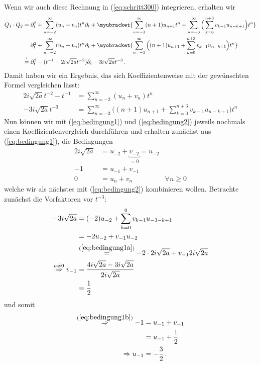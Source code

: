 Wenn wir auch diese Rechnung in (\ref{eq:schritt300}) integrieren, erhalten wir
\begin{align*} %
Q_1\cdot Q_2&=\partial_t^2 + \sum_{n=-2}^\infty (u_n+v_n)t^n \partial_t
  + \myubracket{\sum_{n=-3}^\infty (n+1)u_{n+1}t^{n}
  + \sum_{n=-3}^\infty \Big( \sum_{k=0}^{n+3} v_{k-1}u_{n-k+1} \Big) t^{n}}
\\&=\partial_t^2 + \sum_{n=-2}^\infty (u_n+v_n)t^n \partial_t
  + \myobracket{\sum_{n=-3}^\infty
  \Big( (n+1)u_{n+1} + \sum_{k=0}^{n+3} v_{k-1}u_{n-k+1} \Big) t^{n}}
\\&\overset{!}{=} \partial_t^2 - (t^{-1} - 2i\sqrt{2a}t^{-2})\partial_t
  - 3 i\sqrt{2a}t^{-3} \,.
\end{align*}
Damit haben wir ein Ergebnis, das sich Koeffizientenweise mit der gewünschten
Formel vergleichen lässt:
\begin{align}
2i\sqrt{2a}t^{-2} - t^{-1} &= \sum_{n=-2}^\infty (u_n+v_n)t^n
\label{eq:bedingung1}\\
- 3 i\sqrt{2a}t^{-3} &= \sum_{n=-3}^\infty
  \Big( (n+1)u_{n+1} + \sum_{k=0}^{n+3} v_{k-1}u_{n-k+1} \Big) t^{n}
\label{eq:bedingung2}
\end{align}
Nun können wir mit (\ref{eq:bedingung1}) und (\ref{eq:bedingung2}) jeweils
nochmals einen Koeffizientenvergleich durchführen und erhalten zunächst aus
(\ref{eq:bedingung1}), die Bedingungen
\begin{align}
2i\sqrt{2a} &= u_{-2} + \underset{=0}{\underbrace{v_{-2}}} = u_{-2}
\label{eq:bedingung1a}
\\-1 &= u_{-1} + v_{-1}
\label{eq:bedingung1b}
\\0 &= u_n + v_n & \forall n \geq 0
\label{eq:bedingung1c}
\end{align}
welche wir als nächstes mit (\ref{eq:bedingung2}) kombinieren wollen.
Betrachte zunächst die Vorfaktoren vor $t^{-3}$:
\begin{align*}
- 3 i\sqrt{2a} &= (-2)u_{-2} + \sum_{k=0}^{0} v_{k-1}u_{-3-k+1}
\\&= -2u_{-2} + v_{-1}u_{-2}
\\&\overset{(\ref{eq:bedingung1a})}{=} -2\cdot2i\sqrt{2a} + v_{-1}2i\sqrt{2a}
\\\overset{a\neq0}{\Rightarrow} v_{-1}
  &= \frac{4i\sqrt{2a}-3i\sqrt{2a}}{2i\sqrt{2a}}
\\&= \frac{1}{2}
\end{align*}
und somit
\begin{align*}
\overset{(\ref{eq:bedingung1b})}{\Rightarrow} -1 &=u_{-1}+v_{-1}
\\ &=u_{-1}+\frac{1}{2}
\\\Rightarrow u_{-1}&=-\frac{3}{2} \,.
\end{align*}
